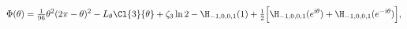 \begin{equation}
\label{PhiH}
\Phi(\theta) 
=  
\tfrac{1}{96} \theta^2 (2\pi-\theta)^2
- L_{\theta} \Cl{3}{\theta}
+ \zeta_3 \ln 2
-  \H_{-1,0,0,1}(1)   
+ \tfrac{1}{2}\Bigl[  
\H_{-1,0,0,1}( e^{{\rm i}\theta}) + \H_{-1,0,0,1}(e^{-{\rm i}\theta})   
\Bigr] ,
\end{equation}

